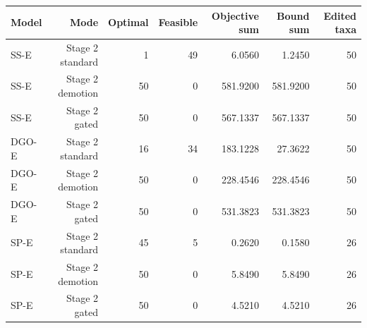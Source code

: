\begin{tabular}{lrrrrrr}
\toprule
Model & Mode & Optimal & Feasible & Objective sum & Bound sum & Edited taxa \\
\midrule
SS-E & Stage 2 standard & 1 & 49 & 6.0560 & 1.2450 & 50 \\
SS-E & Stage 2 demotion & 50 & 0 & 581.9200 & 581.9200 & 50 \\
SS-E & Stage 2 gated & 50 & 0 & 567.1337 & 567.1337 & 50 \\
DGO-E & Stage 2 standard & 16 & 34 & 183.1228 & 27.3622 & 50 \\
DGO-E & Stage 2 demotion & 50 & 0 & 228.4546 & 228.4546 & 50 \\
DGO-E & Stage 2 gated & 50 & 0 & 531.3823 & 531.3823 & 50 \\
SP-E & Stage 2 standard & 45 & 5 & 0.2620 & 0.1580 & 26 \\
SP-E & Stage 2 demotion & 50 & 0 & 5.8490 & 5.8490 & 26 \\
SP-E & Stage 2 gated & 50 & 0 & 4.5210 & 4.5210 & 26 \\
\bottomrule
\end{tabular}
